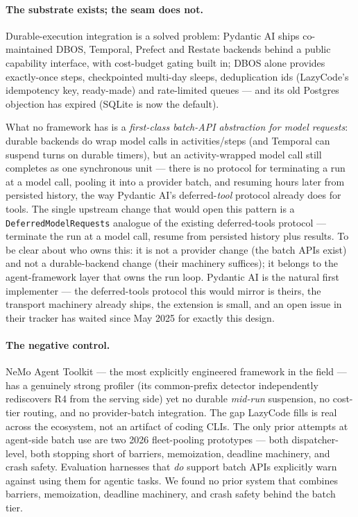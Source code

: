 \documentclass[11pt]{article}
\begin{document}
\paragraph{The substrate exists; the seam does not.} Durable-execution integration is a solved problem: Pydantic AI ships co-maintained DBOS, Temporal, Prefect and Restate backends behind a public capability interface, with cost-budget gating built in; DBOS alone provides exactly-once steps, checkpointed multi-day sleeps, deduplication ids (LazyCode's idempotency key, ready-made) and rate-limited queues --- and its old Postgres objection has expired (SQLite is now the default).

What no framework has is a \emph{first-class batch-API abstraction for model requests}: durable backends do wrap model calls in activities/steps (and Temporal can suspend turns on durable timers), but an activity-wrapped model call still completes as one synchronous unit --- there is no protocol for terminating a run at a model call, pooling it into a provider batch, and resuming hours later from persisted history, the way Pydantic AI's deferred-\emph{tool} protocol already does for tools. The single upstream change that would open this pattern is a \texttt{DeferredModelRequests} analogue of the existing deferred-tools protocol --- terminate the run at a model call, resume from persisted history plus results. To be clear about who owns this: it is not a provider change (the batch APIs exist) and not a durable-backend change (their machinery suffices); it belongs to the agent-framework layer that owns the run loop. Pydantic AI is the natural first implementer --- the deferred-tools protocol this would mirror is theirs, the transport machinery already ships, the extension is small, and an open issue in their tracker has waited since May 2025 for exactly this design.

\paragraph{The negative control.} NeMo Agent Toolkit --- the most explicitly engineered framework in the field --- has a genuinely strong profiler (its common-prefix detector independently rediscovers R4 from the serving side) yet no durable \emph{mid-run} suspension, no cost-tier routing, and no provider-batch integration. The gap LazyCode fills is real across the ecosystem, not an artifact of coding CLIs. The only prior attempts at agent-side batch use are two 2026 fleet-pooling prototypes --- both dispatcher-level, both stopping short of barriers, memoization, deadline machinery, and crash safety. Evaluation harnesses that \emph{do} support batch APIs explicitly warn against using them for agentic tasks. We found no prior system that combines barriers, memoization, deadline machinery, and crash safety behind the batch tier.
\end{document}
